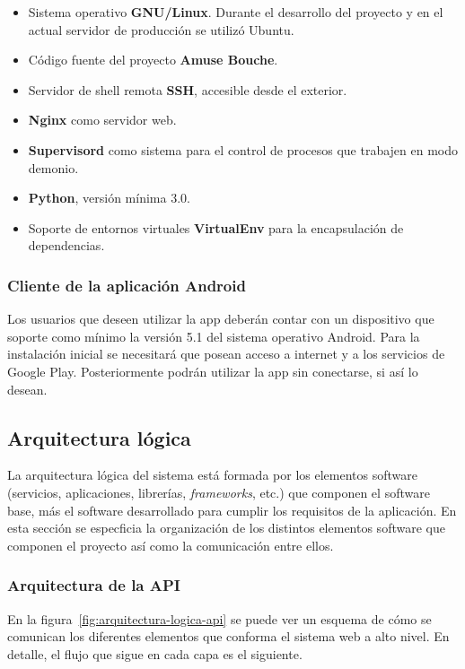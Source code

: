\begin{itemize}
\item Sistema operativo \textbf{GNU/Linux}. Durante el desarrollo del proyecto y
  en el actual servidor de producción se utilizó Ubuntu.
\item Código fuente del proyecto \textbf{Amuse Bouche}.
\item Servidor de shell remota \textbf{SSH}, accesible desde el exterior.
\item \textbf{Nginx} como servidor web.
\item \textbf{Supervisord} como sistema para el control de procesos que trabajen
  en modo demonio.
\item \textbf{Python}, versión mínima 3.0.
\item Soporte de entornos virtuales \textbf{VirtualEnv} para la encapsulación de
  dependencias.
\end{itemize}

\subsubsection{Cliente de la aplicación Android}

Los usuarios que deseen utilizar la app deberán contar con un dispositivo que
soporte como mínimo la versión 5.1 del sistema operativo Android. Para la
instalación inicial se necesitará que posean acceso a internet y a los servicios
de Google Play. Posteriormente podrán utilizar la app sin conectarse, si así lo
desean.


\subsection{Arquitectura lógica}

La arquitectura lógica del sistema está formada por los elementos software
(servicios, aplicaciones, librerías, \textit{frameworks}, etc.) que componen el
software base, más el software desarrollado para cumplir los requisitos de la
aplicación. En esta sección se especficia la organización de los distintos
elementos software que componen el proyecto así como la comunicación entre
ellos. 

\subsubsection{Arquitectura de la API}
\label{subsec:arquitectura-logica-api}

En la figura~\ref{fig:arquitectura-logica-api} se puede ver un esquema de cómo se
comunican los diferentes elementos que conforma el sistema web a alto nivel. En
detalle, el flujo que sigue en cada capa es el siguiente.

